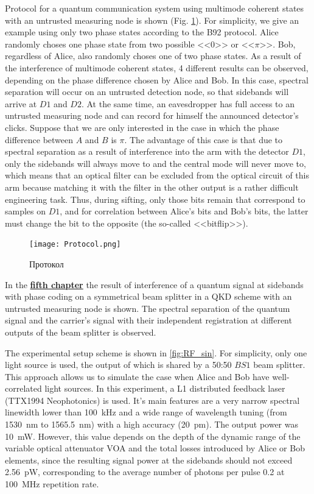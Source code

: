 Protocol for a quantum communication system using multimode coherent states with an untrusted measuring node is shown (Fig. \ref{fig:Protocol}). For simplicity, we give an example using only two phase states according to the B92 protocol. Alice randomly choses one phase state from two possible <<$0$>> or <<$\pi$>>. Bob, regardless of Alice, also randomly choses one of two phase states. As a result of the interference of multimode coherent states, 4 different results can be observed, depending on the phase difference chosen by Alice and Bob. In this case, spectral separation will occur on an untrusted detection node, so that sidebands will arrive at $D1$ and $D2$. At the same time, an eavesdropper has full access to an untrusted measuring node and can record for himself the announced detector's clicks. Suppose that we are only interested in the case in which the phase difference between $A$ and $B$ is $\pi$. The advantage of this case is that due to spectral separation as a result of interference into the arm with the detector $D1$, only the sidebands will always move to and the central mode will never move to, which means that an optical filter can be excluded from the optical circuit of this arm because matching it with the filter in the other output is a rather difficult engineering task. Thus, during sifting, only those bits remain that correspond to samples on $D1$, and for correlation between Alice's bits and Bob's bits, the latter must change the bit to the opposite (the so-called <<bitflip>>).

\begin{figure}[ht]
 \centering
  \texttt{[image: Protocol.png]}
  \caption{Протокол}
  \label{fig:Protocol}
\end{figure}
 
  In the \underline{\textbf{fifth chapter}} the result of interference of a quantum signal at sidebands with phase coding on a symmetrical beam splitter in a QKD scheme with an untrusted measuring node is shown. The spectral separation of the quantum signal and the carrier's signal with their independent registration at different outputs of the beam splitter is observed. 
  
 The experimental setup scheme is shown in \ref{fig:RF_sin}. For simplicity, only one light source is used, the output of which is shared by a 50:50 $BS1$ beam splitter. This approach allows us to simulate the case when Alice and Bob have well-correlated light sources. In this experiment, a L1 distributed feedback laser (TTX1994 Neophotonics) is used. It's main features are a very narrow spectral linewidth lower than 100~kHz and a wide range of wavelength tuning (from 1530~nm to 1565.5~nm) with a high accuracy (20~pm). The output power was 10~mW. However, this value depends on the depth of the dynamic range of the variable optical attenuator VOA and the total losses introduced by Alice or Bob elements, since the resulting signal power at the sidebands should not exceed 2.56~pW, corresponding to the average number of photons per pulse 0.2 at 100~MHz repetition rate.

